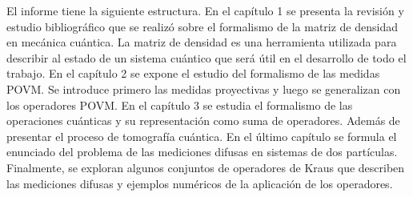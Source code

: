 El informe tiene la siguiente estructura.  En el capítulo 1 se presenta la
revisión y estudio bibliográfico que se realizó sobre el formalismo de la
matriz de densidad en mecánica cuántica. La matriz de densidad es una
herramienta utilizada para describir al estado de un sistema cuántico que será
útil en el desarrollo de todo el trabajo. En el capítulo 2 se expone el estudio
del formalismo de las medidas POVM\@. Se introduce primero las medidas
proyectivas y luego se generalizan con los operadores POVM\@. En el capítulo 3
se estudia el formalismo de las operaciones cuánticas y su representación como
suma de operadores. Además de presentar el proceso de tomografía cuántica. En
el último capítulo se formula el enunciado del problema de las mediciones
difusas en sistemas de dos partículas. Finalmente, se exploran algunos
conjuntos de operadores de Kraus que describen las mediciones difusas y
ejemplos numéricos de la aplicación de los operadores. 


